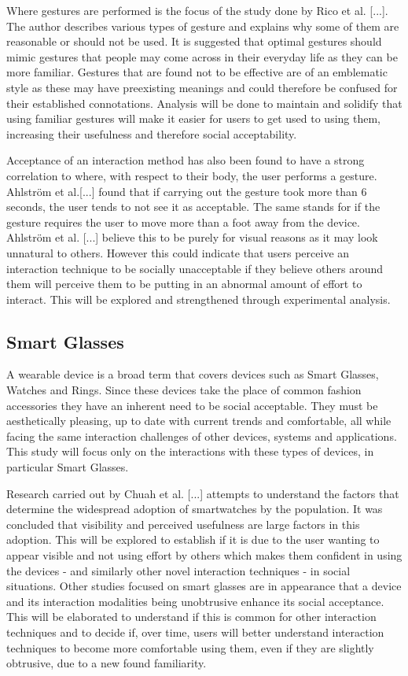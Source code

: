 \documentclass{l4proj}
\begin{document}
Where gestures are performed is the focus of the study done by Rico et al. [...]. The author describes various types of gesture and explains why some of them are reasonable or should not be used. It is suggested that optimal gestures should mimic gestures that people may come across in their everyday life as they can be more familiar. Gestures that are found not to be effective are of an emblematic style as these may have preexisting meanings and could therefore be confused for their established connotations. Analysis will be done to maintain and solidify that using familiar gestures will make it easier for users to get used to using them, increasing their usefulness and therefore social acceptability.

Acceptance of an interaction method has also been found to have a strong correlation to where, with respect to their body, the user performs a gesture. Ahlström et al.[...] found that if carrying out the gesture took more than 6 seconds, the user tends to not see it as acceptable. The same stands for if the gesture requires the user to move more than a foot away from the device. Ahlström et al. [...] believe this to be purely for visual reasons as it may look unnatural to others. However this could indicate that users perceive an interaction technique to be socially unacceptable if they believe others around them will perceive them to be putting in an abnormal amount of effort to interact. This will be explored and strengthened through experimental analysis.

\subsection{Smart Glasses}

A wearable device is a broad term that covers devices such as Smart Glasses, Watches and Rings. Since these devices take the place of common fashion accessories they have an inherent need to be social acceptable. They must be  aesthetically pleasing, up to date with current trends and comfortable, all while facing the same interaction challenges of other devices, systems and applications. This study will focus only on the interactions with these types of devices, in particular Smart Glasses.

Research carried out by Chuah et al. [...] attempts to understand the factors that determine the widespread adoption of smartwatches by the population. It was concluded that visibility and perceived usefulness are large factors in this adoption. This will be explored to establish if it is due to the user wanting to appear visible and not using effort 
by others which makes them confident in using the devices - and similarly other novel interaction techniques - in social situations. Other studies focused on smart glasses are in appearance that a device and its interaction modalities being unobtrusive enhance its social acceptance. This will be elaborated to understand if this is common for other interaction techniques and to decide if, over time, users will better understand interaction techniques to become more comfortable using them, even if they are slightly obtrusive, due to a new found familiarity.
\end{document}
